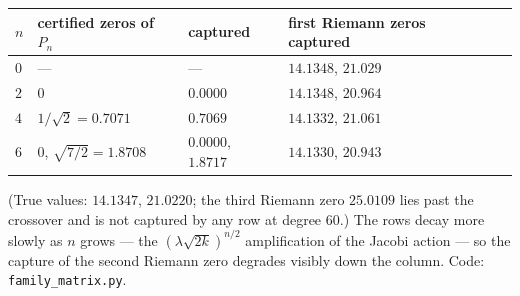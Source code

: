 \documentclass[11pt]{article}
\theoremstyle{remark}
\begin{document}
\begin{center}
\begin{tabular}{@{}lllll@{}}
\toprule
$n$ & certified zeros of $P_n$ & captured & first Riemann zeros captured \\
\midrule
$0$ & --- & --- & $14.1348$, $21.029$ \\
$2$ & $0$ & $0.0000$ & $14.1348$, $20.964$ \\
$4$ & $1/\sqrt{2} = 0.7071$ & $0.7069$ & $14.1332$, $21.061$ \\
$6$ & $0$, $\sqrt{7/2} = 1.8708$ & $0.0000$, $1.8717$ & $14.1330$, $20.943$ \\
\bottomrule
\end{tabular}
\end{center}

(True values: $14.1347$, $21.0220$; the third Riemann zero $25.0109$ lies past the crossover and is not captured by any row at degree $60$.) The rows decay more slowly as $n$ grows --- the $(\lambda\sqrt{2k})^{n/2}$ amplification of the Jacobi action --- so the capture of the second Riemann zero degrades visibly down the column. Code: \texttt{family\_matrix.py}.
\end{document}
